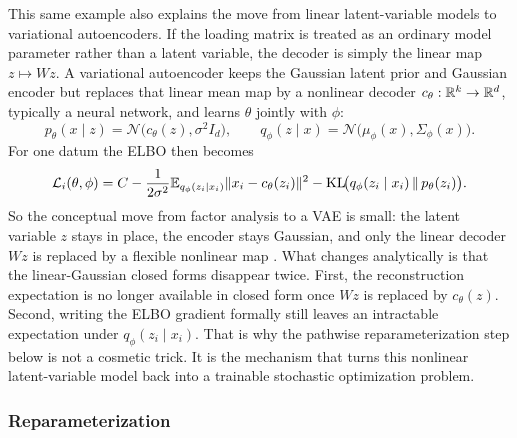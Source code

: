 This same example also explains the move from linear latent-variable models to variational autoencoders.
If the loading matrix is treated as an ordinary model parameter rather than a latent variable, the decoder is simply the linear map \(z\mapsto Wz\).
A variational autoencoder keeps the Gaussian latent prior and Gaussian encoder but replaces that linear mean map by a nonlinear decoder \(c_\theta:\mathbb{R}^k\to\mathbb{R}^d\), typically a neural network, and learns \(\theta\) jointly with \(\phi\):
\[
  p_\theta(x\mid z)
  =
  \mathcal{N}\!\bigl(c_\theta(z),\sigma^2 I_d\bigr),
  \qquad
  q_\phi(z\mid x)
  =
  \mathcal{N}\!\bigl(\mu_\phi(x),\Sigma_\phi(x)\bigr).
\]
For one datum the ELBO then becomes
\[
  \mathcal{L}_i(\theta,\phi)
  =
  C
  -
  \frac{1}{2\sigma^2}
  \mathbb{E}_{q_\phi(z_i\mid x_i)}\lVert x_i-c_\theta(z_i)\rVert^2
  -
  \operatorname{KL}\!\bigl(q_\phi(z_i\mid x_i)\,\|\,p_\theta(z_i)\bigr).
\]
So the conceptual move from factor analysis to a VAE is small:
the latent variable \(z\) stays in place, the encoder stays Gaussian, and only the linear decoder \(Wz\) is replaced by a flexible nonlinear map \citep[\S2.3]{kingma_welling_2014_aevb}.
What changes analytically is that the linear-Gaussian closed forms disappear twice.
First, the reconstruction expectation is no longer available in closed form once \(Wz\) is replaced by \(c_\theta(z)\).
Second, writing the ELBO gradient formally still leaves an intractable expectation under \(q_\phi(z_i\mid x_i)\).
That is why the pathwise reparameterization step below is not a cosmetic trick.
It is the mechanism that turns this nonlinear latent-variable model back into a trainable stochastic optimization problem.

\subsubsection{Reparameterization}
\label{subsubsec:reparameterization-trick}

